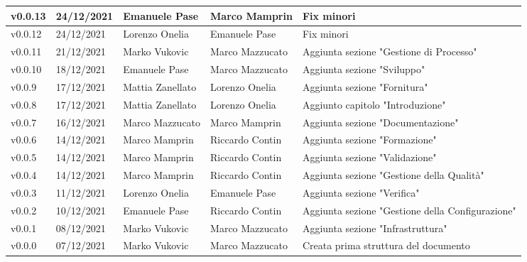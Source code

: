 {\begin{longtable}{|C{1.8cm}|C{2.1cm}|C{2cm}|C{2.4cm}|L{4.4cm}|}
  v0.0.13    & 24/12/2021    & Emanuele Pase    & Marco Mamprin         & Fix minori  \\ \hline
  v0.0.12    & 24/12/2021    & Lorenzo Onelia   & Emanuele Pase         & Fix minori \\ \hline
  v0.0.11    & 21/12/2021    & Marko Vukovic    & Marco Mazzucato       & Aggiunta sezione "Gestione di Processo" \\ \hline
  v0.0.10    & 18/12/2021    & Emanuele Pase    & Marco Mazzucato       & Aggiunta sezione "Sviluppo" \\ \hline
  v0.0.9     & 17/12/2021    & Mattia Zanellato & Lorenzo Onelia        & Aggiunta sezione "Fornitura" \\ \hline
  v0.0.8     & 17/12/2021    & Mattia Zanellato & Lorenzo Onelia        & Aggiunto capitolo "Introduzione" \\ \hline
  v0.0.7     & 16/12/2021    & Marco Mazzucato  & Marco Mamprin         & Aggiunta sezione "Documentazione" \\ \hline
  v0.0.6     & 14/12/2021    & Marco Mamprin    & Riccardo Contin       & Aggiunta sezione "Formazione" \\ \hline
  v0.0.5     & 14/12/2021    & Marco Mamprin    & Riccardo Contin       & Aggiunta sezione "Validazione" \\ \hline
  v0.0.4     & 14/12/2021    & Marco Mamprin    & Riccardo Contin       & Aggiunta sezione "Gestione della Qualità" \\ \hline
  v0.0.3     & 11/12/2021    & Lorenzo Onelia   & Emanuele Pase         & Aggiunta sezione "Verifica" \\ \hline
  v0.0.2     & 10/12/2021    & Emanuele Pase    & Riccardo Contin       & Aggiunta sezione "Gestione della Configurazione" \\ \hline
  v0.0.1     & 08/12/2021    & Marko Vukovic    & Marco Mazzucato       & Aggiunta sezione "Infrastruttura" \\ \hline
  v0.0.0     & 07/12/2021    & Marko Vukovic    & Marco Mazzucato       & Creata prima struttura del documento \\ \hline
\end{longtable}}

\renewcommand\arraystretch{1}
